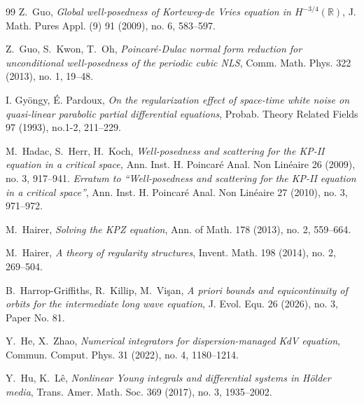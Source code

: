 \documentclass[letterpaper, 11pt,  reqno]{amsart}
\newcommand{\1}{\hspace{0.5mm}\text{I}\hspace{0.5mm}}
\newcommand{\R}{\mathbb{R}}
\numberwithin{equation}{section}
\numberwithin{theorem}{section}
\begin{document}
\begin{thebibliography}{99}
Z.~Guo,
{\it  Global well-posedness of Korteweg-de Vries equation in $H^{-3/4}(\R)$}, 
J. Math. Pures Appl. (9) 91 (2009), no. 6, 583--597.


Z.~Guo, S.~Kwon, T.~Oh, 
{\it Poincar\'e-Dulac normal form reduction for unconditional well-posedness of
the periodic cubic NLS}, Comm. Math. Phys. 322 (2013), no. 1, 19--48.



I. Gy{\"o}ngy, 
{\'E}. Pardoux, 
{\it On the regularization effect of space-time white noise on quasi-linear parabolic partial differential equations}, 
Probab. Theory Related Fields 97 (1993), no.1-2, 211--229.



M.~Hadac, S.~Herr, H.~Koch,
{\it Well-posedness and scattering for the KP-II equation in a critical space,}
 Ann. Inst. H. Poincar\'e Anal. Non Lin\'eaire  26 (2009), no. 3, 917--941.
{\it  Erratum to ``Well-posedness and scattering for the KP-II equation in a critical space''},
Ann. Inst. H. Poincar\'e Anal. Non Lin\'eaire 27 (2010), no. 3, 971--972.


%
%


M.~Hairer,
{\it Solving the KPZ equation},
Ann. of Math.  178 (2013), no. 2, 559--664.



M.~Hairer,
{\it A theory of regularity structures},
Invent. Math. 198 (2014), no. 2, 269--504.

%
%
%


B.~Harrop-Griffiths, R.~Killip, M.~Vi\c{s}an,
\textit{A priori bounds and equicontinuity of orbits for the intermediate long wave equation}, 
J. Evol. Equ. 26 (2026), no. 3, Paper No. 81.


Y.~He, X.~Zhao,
{\it Numerical integrators for dispersion-managed KdV equation}, 
Commun. Comput. Phys. 31 (2022), no. 4, 1180--1214. 


Y.~Hu, K.~L\^e, 
{\it Nonlinear Young integrals and differential systems in H\"older media},
 Trans. Amer. Math. Soc. 369 (2017), no. 3, 1935--2002. 


%
%
%
%
%
%
%




\end{thebibliography}
\end{document}

